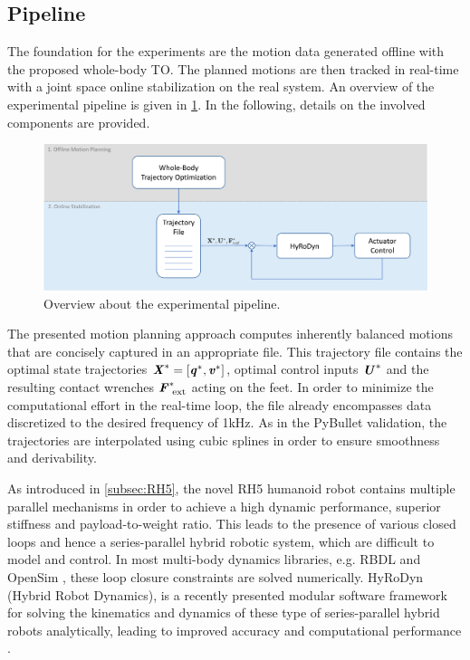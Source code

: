 \subsection{Pipeline}\label{subsec:Pipeline}
The foundation for the experiments are the motion data generated offline with the proposed whole-body \gls{TO}. The planned motions are then tracked in real-time with a joint space online stabilization on the real system. An overview of the experimental pipeline is given in \cref{img:experimentalSetup}. In the following, details on the involved components are provided. 
\begin{figure}[h]
\centering	
\includegraphics[width=1\textwidth]{img/experimentalSetup1}
\caption{Overview about the experimental pipeline.}
\label{img:experimentalSetup}
\end{figure}
The presented motion planning approach computes inherently balanced motions that are concisely captured in an appropriate file. This trajectory file contains the optimal state trajectories $\bm{\mathit{X}}^*=[\bm{\mathit{q}}^*,\bm{\mathit{v}}^*]$, optimal control inputs $\bm{\mathit{U}}^*$ and the resulting contact wrenches $\bm{\mathit{F}}_{\text{ ext}}^*$ acting on the feet. In order to minimize the computational effort in the real-time loop, the file already encompasses data discretized to the desired frequency of 1kHz. As in the PyBullet validation, the trajectories are interpolated using cubic splines in order to ensure smoothness and derivability. 

As introduced in \cref{subsec:RH5}, the novel RH5 humanoid robot contains multiple parallel mechanisms in order to achieve a high dynamic performance, superior stiffness and payload-to-weight ratio. This leads to the presence of various closed loops and hence a series-parallel hybrid robotic system, which are difficult to model and control. In most multi-body dynamics libraries, e.g. RBDL \cite{felis2017rbdl} and OpenSim \cite{delp2007opensim}, these loop closure constraints are solved numerically. HyRoDyn (Hybrid Robot Dynamics), is a recently presented modular software framework for solving the kinematics and dynamics of these type of series-parallel hybrid robots analytically, leading to improved accuracy and computational performance \cite{kumar2018hyrodyn}.

